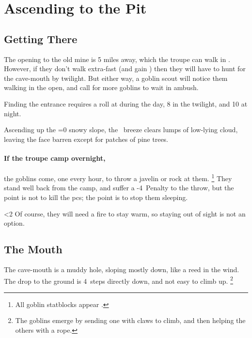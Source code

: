 \section{Ascending to the Pit}

\begin{multicols}{2}

\renewcommand\npcsymbol{\gls{night}}

\subsection{Getting There}

The opening to the old mine is 5 miles away, which the troupe can walk in .
However, if they don't walk extra-fast (and gain ) then they will have to hunt for the cave-mouth by twilight.
But either way, a goblin scout will notice them walking in the open, and call for more goblins to wait in ambush.

Finding the entrance requires a  roll at \tn[6] during the day, 8 in the twilight, and 10 at night.

\begin{boxtext}
  Ascending up the \ifnum\value{temperature}=0 snowy \fi slope, the \showTemperature\ breeze clears lumps of low-lying cloud, leaving the face barren except for patches of pine trees.
\end{boxtext}

\paragraph{If the troupe camp overnight,}
the goblins come, one every hour, to throw a javelin or rock at them.%
\footnote{All goblin statblocks appear .}
They stand well back from the camp, and suffer a -4~Penalty to the throw, but the point is not to kill the \glspl{pc}; the point is to stop them sleeping.

\ifnum\value{temperature}<2%
  Of course, they will need a fire to stay warm, so staying out of sight is not an option.
\fi

\playCommentaryCaveIn[t]

\subsection{The Mouth}

The cave-mouth is a muddy hole, sloping mostly down, like a reed in the wind.
The drop to the ground is 4~\glspl{step} directly down, and not easy to climb up.%
\footnote{The goblins emerge by sending one with claws to climb, and then helping the others with a rope.}


\end{multicols}
